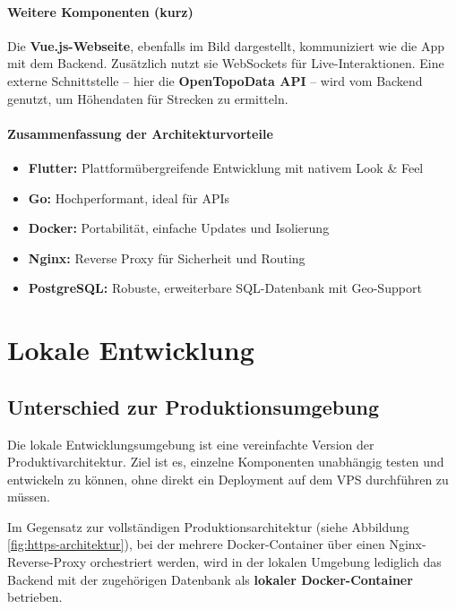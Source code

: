 \documentclass[11pt,a4paper]{article}
\begin{document}
\paragraph{Weitere Komponenten (kurz)}
Die \textbf{Vue.js-Webseite}, ebenfalls im Bild dargestellt, kommuniziert wie die App mit dem Backend. Zusätzlich nutzt sie WebSockets für Live-Interaktionen. Eine externe Schnittstelle – hier die \textbf{OpenTopoData API} – wird vom Backend genutzt, um Höhendaten für Strecken zu ermitteln.

\paragraph{Zusammenfassung der Architekturvorteile}
\begin{itemize}
    \item \textbf{Flutter:} Plattformübergreifende Entwicklung mit nativem Look \& Feel
    \item \textbf{Go:} Hochperformant, ideal für APIs
    \item \textbf{Docker:} Portabilität, einfache Updates und Isolierung
    \item \textbf{Nginx:} Reverse Proxy für Sicherheit und Routing
    \item \textbf{PostgreSQL:} Robuste, erweiterbare SQL-Datenbank mit Geo-Support
\end{itemize}

\section{Lokale Entwicklung}
\label{sec:lokale-entwicklung}

\subsection*{Unterschied zur Produktionsumgebung}

Die lokale Entwicklungsumgebung ist eine vereinfachte Version der Produktivarchitektur. Ziel ist es, einzelne Komponenten unabhängig testen und entwickeln zu können, ohne direkt ein Deployment auf dem VPS durchführen zu müssen.

Im Gegensatz zur vollständigen Produktionsarchitektur (siehe Abbildung \ref{fig:https-architektur}), bei der mehrere Docker-Container über einen Nginx-Reverse-Proxy orchestriert werden, wird in der lokalen Umgebung lediglich das Backend mit der zugehörigen Datenbank als \textbf{lokaler Docker-Container} betrieben.
\end{document}
